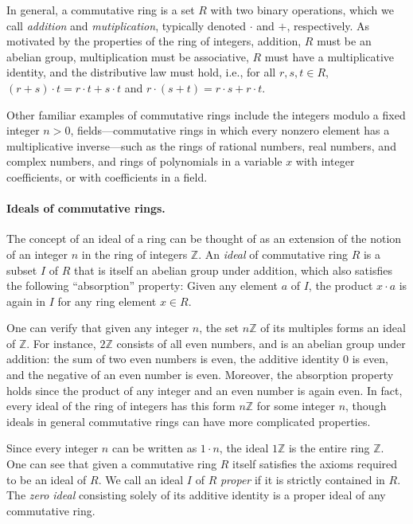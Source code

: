 \documentclass{article}
\begin{document}
In general, a commutative ring is a set $R$ with two binary operations, which
we call \emph{addition} and \emph{mutiplication}, typically denoted $\cdot$ and
$+$, respectively. As motivated by the properties of the ring of integers,
addition, $R$ must be an abelian group, multiplication must be associative, $R$
must have a multiplicative identity, and the distributive law must hold, i.e.,
for all $r, s, t \in R$, $(r+s)\cdot t = r \cdot t + s \cdot t$ and
$r \cdot (s+t) = r \cdot s + r \cdot t$.

Other familiar examples of commutative rings include the integers modulo a
fixed integer $n>0$, fields---commutative rings in which every nonzero element
has a multiplicative inverse---such as the rings of rational numbers, real
numbers, and complex numbers, and rings of polynomials in a variable $x$ with
integer coefficients, or with coefficients in a field.


\paragraph{Ideals of commutative rings.}
The concept of an {ideal} of a ring can be thought of as an extension of the
notion of an integer $n$ in the ring of integers $\mathbb{Z}$. An \emph{ideal}
of commutative ring $R$ is a subset $I$ of $R$ that is itself an abelian group
under addition, which also satisfies the following ``absorption'' property:
Given any element $a$ of $I$, the product  $x \cdot a$ is again in $I$ for any
ring element $x \in R$. 

One can verify that given any integer $n$, the set $n\mathbb{Z}$ of its
multiples forms an ideal of $\mathbb{Z}$. For instance, $2 \mathbb{Z}$
consists of all even numbers, and is an abelian group under addition: the sum
of two even numbers is even, the additive identity $0$ is even, and the
negative of an even number is even. Moreover, the absorption property holds
since the product of any integer and an even number is again even. In fact,
every ideal of the ring of integers has this form $n\mathbb{Z}$ for some
integer $n$, though ideals in general commutative rings can have more
complicated properties. 

Since every integer $n$ can be written as $1 \cdot n$, the ideal $1 \mathbb{Z}$
is the entire ring $\mathbb{Z}$. One can see that given a commutative ring
$R$ itself satisfies the axioms required to be an ideal of $R$. We call an
ideal $I$ of $R$ \emph{proper} if it is strictly contained in $R$. The
\emph{zero ideal} consisting solely of its additive identity is a proper ideal
of any commutative ring. 
\end{document}
